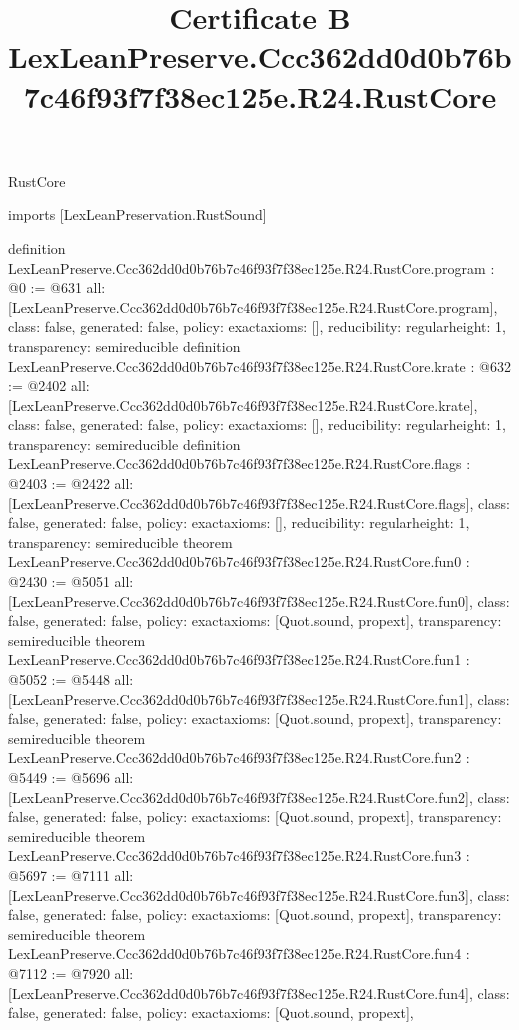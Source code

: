 \begin{lexlean}{RustCore}
\title{Certificate B LexLeanPreserve.Ccc362dd0d0b76b7c46f93f7f38ec125e.R24.RustCore}
\begin{coremodule}
imports [LexLeanPreservation.RustSound]

definition LexLeanPreserve.Ccc362dd0d0b76b7c46f93f7f38ec125e.R24.RustCore.program : @0 := @631 {
  all: [LexLeanPreserve.Ccc362dd0d0b76b7c46f93f7f38ec125e.R24.RustCore.program],
  class: false,
  generated: false,
  policy: exact{axioms: []},
  reducibility: regular{height: 1},
  transparency: semireducible
}
definition LexLeanPreserve.Ccc362dd0d0b76b7c46f93f7f38ec125e.R24.RustCore.krate : @632 := @2402 {
  all: [LexLeanPreserve.Ccc362dd0d0b76b7c46f93f7f38ec125e.R24.RustCore.krate],
  class: false,
  generated: false,
  policy: exact{axioms: []},
  reducibility: regular{height: 1},
  transparency: semireducible
}
definition LexLeanPreserve.Ccc362dd0d0b76b7c46f93f7f38ec125e.R24.RustCore.flags : @2403 := @2422 {
  all: [LexLeanPreserve.Ccc362dd0d0b76b7c46f93f7f38ec125e.R24.RustCore.flags],
  class: false,
  generated: false,
  policy: exact{axioms: []},
  reducibility: regular{height: 1},
  transparency: semireducible
}
theorem LexLeanPreserve.Ccc362dd0d0b76b7c46f93f7f38ec125e.R24.RustCore.fun0 : @2430 := @5051 {
  all: [LexLeanPreserve.Ccc362dd0d0b76b7c46f93f7f38ec125e.R24.RustCore.fun0],
  class: false,
  generated: false,
  policy: exact{axioms: [Quot.sound, propext]},
  transparency: semireducible
}
theorem LexLeanPreserve.Ccc362dd0d0b76b7c46f93f7f38ec125e.R24.RustCore.fun1 : @5052 := @5448 {
  all: [LexLeanPreserve.Ccc362dd0d0b76b7c46f93f7f38ec125e.R24.RustCore.fun1],
  class: false,
  generated: false,
  policy: exact{axioms: [Quot.sound, propext]},
  transparency: semireducible
}
theorem LexLeanPreserve.Ccc362dd0d0b76b7c46f93f7f38ec125e.R24.RustCore.fun2 : @5449 := @5696 {
  all: [LexLeanPreserve.Ccc362dd0d0b76b7c46f93f7f38ec125e.R24.RustCore.fun2],
  class: false,
  generated: false,
  policy: exact{axioms: [Quot.sound, propext]},
  transparency: semireducible
}
theorem LexLeanPreserve.Ccc362dd0d0b76b7c46f93f7f38ec125e.R24.RustCore.fun3 : @5697 := @7111 {
  all: [LexLeanPreserve.Ccc362dd0d0b76b7c46f93f7f38ec125e.R24.RustCore.fun3],
  class: false,
  generated: false,
  policy: exact{axioms: [Quot.sound, propext]},
  transparency: semireducible
}
theorem LexLeanPreserve.Ccc362dd0d0b76b7c46f93f7f38ec125e.R24.RustCore.fun4 : @7112 := @7920 {
  all: [LexLeanPreserve.Ccc362dd0d0b76b7c46f93f7f38ec125e.R24.RustCore.fun4],
  class: false,
  generated: false,
  policy: exact{axioms: [Quot.sound, propext]},
}
\end{coremodule}
\end{lexlean}
